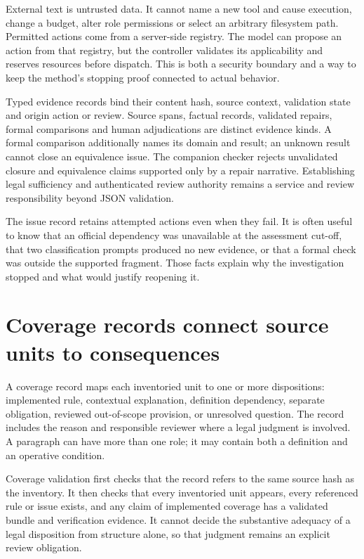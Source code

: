 \documentclass[12pt,a4paper,oneside,openany]{book}
\begin{document}
External text is untrusted data. It cannot name a new tool and cause execution,
change a budget, alter role permissions or select an arbitrary filesystem path.
Permitted actions come from a server-side registry. The model can propose an
action from that registry, but the controller validates its applicability and
reserves resources before dispatch. This is both a security boundary and a way to
keep the method's stopping proof connected to actual behavior.

Typed evidence records bind their content hash, source context, validation state
and origin action or review. Source spans, factual records, validated repairs,
formal comparisons and human adjudications are distinct evidence kinds. A formal
comparison additionally names its domain and result; an unknown result cannot
close an equivalence issue. The companion checker rejects unvalidated closure
and equivalence claims supported only by a repair narrative. Establishing legal
sufficiency and authenticated review authority remains a service and review
responsibility beyond JSON validation.

The issue record retains attempted actions even when they fail. It is often useful
to know that an official dependency was unavailable at the assessment cut-off,
that two classification prompts produced no new evidence, or that a formal check
was outside the supported fragment. Those facts explain why the investigation
stopped and what would justify reopening it.

\section{Coverage records connect source units to consequences}
\label{merge:M08:05}


A coverage record maps each inventoried unit to one or more dispositions:
implemented rule, contextual explanation, definition dependency, separate
obligation, reviewed out-of-scope provision, or unresolved question. The record
includes the reason and responsible reviewer where a legal judgment is involved.
A paragraph can have more than one role; it may contain both a definition and an
operative condition.

Coverage validation first checks that the record refers to the same source hash
as the inventory. It then checks that every inventoried unit appears, every
referenced rule or issue exists, and any claim of implemented coverage has a
validated bundle and verification evidence. It cannot decide the substantive
adequacy of a legal disposition from structure alone, so that judgment remains
an explicit review obligation.
\end{document}
